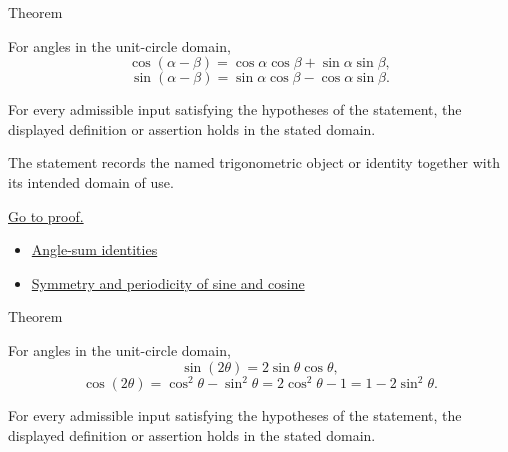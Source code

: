 

\begin{theorembox}{Theorem}
\begin{theorem}
\label{thm:trig-angle-difference-identities}
For angles in the unit-circle domain,
\[
  \cos(\alpha-\beta)=\cos\alpha\cos\beta+\sin\alpha\sin\beta,
\]
\[
  \sin(\alpha-\beta)=\sin\alpha\cos\beta-\cos\alpha\sin\beta.
\]
\end{theorem}
\end{theorembox}
\begin{remark*}
For every admissible input satisfying the hypotheses of the statement, the
displayed definition or assertion holds in the stated domain.
\end{remark*}

\begin{remark*}[Interpretation]
The statement records the named trigonometric object or identity together with
its intended domain of use.
\end{remark*}

\begin{remark*}[Proof]
\hyperref[prf:trig-angle-difference-identities]{Go to proof.}
\end{remark*}
\begin{dependencies}
\begin{itemize}
  \item \hyperref[thm:trig-angle-sum-identities]{Angle-sum identities}
  \item \hyperref[thm:trig-symmetry-periodicity]{Symmetry and periodicity of sine and cosine}
\end{itemize}
\end{dependencies}



\begin{theorembox}{Theorem}
\begin{theorem}
\label{thm:trig-double-angle-identities}
For angles in the unit-circle domain,
\[
  \sin(2\theta)=2\sin\theta\cos\theta,
\]
\[
  \cos(2\theta)=\cos^2\theta-\sin^2\theta
  =2\cos^2\theta-1
  =1-2\sin^2\theta.
\]
\end{theorem}
\end{theorembox}
\begin{remark*}
For every admissible input satisfying the hypotheses of the statement, the
displayed definition or assertion holds in the stated domain.
\end{remark*}

